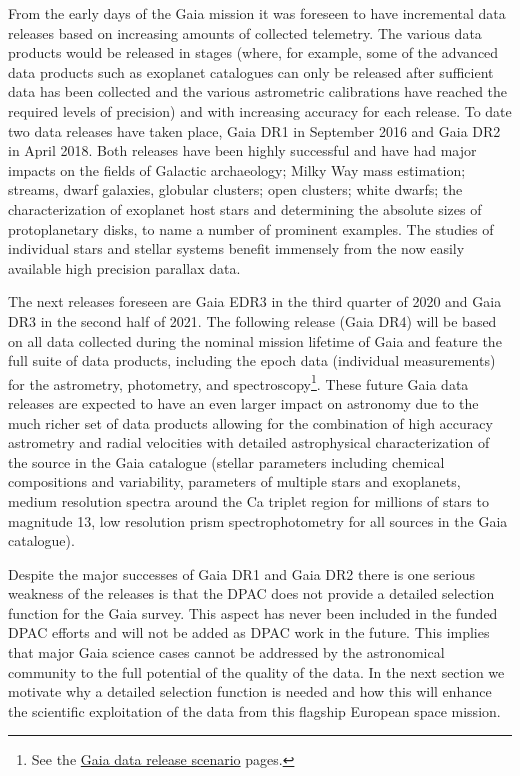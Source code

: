 From the early days of the Gaia mission it was foreseen to have incremental data releases based on increasing amounts of collected telemetry. The various data products would be released in stages (where, for example, some of the advanced data products such as exoplanet catalogues can only be released after sufficient data has been collected and the various astrometric calibrations have reached the required levels of precision) and with increasing accuracy for each release. To date two data releases have taken place, Gaia DR1 in September 2016 and Gaia DR2 in April 2018. Both releases have been highly successful and have had major impacts on the fields of Galactic archaeology; Milky Way mass estimation; streams, dwarf galaxies, globular clusters; open clusters; white dwarfs; the characterization of exoplanet host stars and determining the absolute sizes of protoplanetary disks, to name a number of prominent examples. The studies of individual stars and stellar systems benefit immensely from the now easily available high precision parallax data.

The next releases foreseen are Gaia EDR3 in the third quarter of 2020 and Gaia DR3 in the second half of 2021. The following release (Gaia DR4) will be based on all data collected during the nominal mission lifetime of Gaia and feature the full suite of data products, including the epoch data (individual measurements) for the astrometry, photometry, and spectroscopy\footnote{See the \href{https://www.cosmos.esa.int/web/gaia/release}{Gaia data release scenario} pages.}. These future Gaia data releases are expected to have an even larger impact on astronomy due to the much richer set of data products allowing for the combination of high accuracy astrometry and radial velocities with detailed astrophysical characterization of the source in the Gaia catalogue (stellar parameters including chemical compositions and variability, parameters of multiple stars and exoplanets, medium resolution spectra around the Ca triplet region for millions of stars to magnitude 13, low resolution prism spectrophotometry for all sources in the Gaia catalogue). 

Despite the major successes of Gaia DR1 and Gaia DR2 there is one serious weakness of the releases is that the DPAC does not provide a detailed selection function for the Gaia survey. This aspect has never been included in the funded DPAC efforts and will not be added as DPAC work in the future. This implies that major Gaia science cases cannot be addressed by the astronomical community to the full potential of the quality of the data. In the next section we motivate why a detailed selection function is needed and how this will enhance the scientific exploitation of the data from this flagship European space mission.

